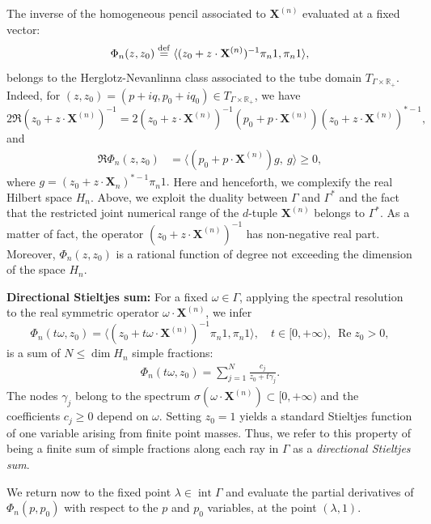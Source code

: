 \documentclass[11pt,reqno]{amsart}
\theoremstyle{plain}
\theoremstyle{definition}
\numberwithin{equation}{section}
\newcommand{\bydef}{\stackrel{\rm def}{=}}
\begin{document}
	
	The inverse of the homogeneous pencil associated to $\mathbf{X}^{(n)}$ evaluated at a fixed vector:
	\begin{equation}\label{Phi}
	\Phi_n(z, z_0) \bydef \langle (z_0 + z \cdot \mathbf{X}^{(n)})^{-1} \pi_n 1, \pi_n 1  \rangle,
	\end{equation}
	belongs to the Herglotz-Nevanlinna class associated to the tube domain $T_{\Gamma \times \mathbb{R}_+}$. Indeed, for $(z, z_0) = (p+ i q, p_0 + i q_0) \in T_{\Gamma \times \mathbb{R}_+}$, we have
	$$
	2 \Re ( z_0 + z \cdot {\mathbf X}^{(n)} )^{-1} 
	= 2 (z_0 + z \cdot {\mathbf X}^{(n)} )^{-1} ( p_0 + p\cdot {\mathbf X}^{(n)}) 
	(z_0 + z \cdot {\mathbf X}^{(n)} )^{*-1},
	$$
	and 
	\begin{align*}
		\Re \Phi_n(z, z_0) &=  \langle ( p_0 + p\cdot \mathbf{X}^{(n)} ) g , \ g  \rangle \geq 0,
	\end{align*}
	where $g = (z_0 + z \cdot {\mathbf X}_n )^{*-1} \pi_n1.$ Here and henceforth, we complexify the real Hilbert space $H_n$.
	Above, we exploit the duality between $\Gamma$ and $\Gamma^\ast$ and the fact that the restricted joint numerical range of the $d$-tuple $\mathbf{X}^{(n)}$ belongs to $\Gamma^\ast$.
	As a matter of fact, the operator  $(z_0 + z \cdot \mathbf{X}^{(n)})^{-1}$ has non-negative real part.
	Moreover, $\Phi_n(z, z_0)$ is a rational function of degree not exceeding the dimension of the space $H_n$. 

\vspace{2mm}

\noindent \textbf{Directional Stieltjes sum:}
For a fixed $\omega \in \Gamma$, applying the spectral resolution to the real symmetric operator $\omega \cdot \mathbf{X}^{(n)}$, we infer
$$
\Phi_n(t \omega, z_0) = \langle (z_0 + t\omega \cdot \mathbf{X}^{(n)})^{-1} \pi_n 1, \pi_n 1 \rangle, \quad t \in [0, +\infty), \ \operatorname{Re} z_0 > 0, 
$$
is a sum of $N \leq \dim H_n$ simple fractions:
\begin{align*}
    \Phi_n(t\omega, z_0) = \sum_{j=1}^N \frac{c_j}{z_0 + t \gamma_j}.
\end{align*}
The nodes $\gamma_j$ belong to the spectrum $\sigma(\omega \cdot \mathbf{X}^{(n)}) \subset [0, +\infty)$ and the coefficients $c_j \geq 0$ depend on $\omega$. Setting $z_0 = 1$ yields a standard Stieltjes function of one variable arising from finite point masses. Thus, we refer to this property of being a finite sum of simple fractions along each ray in $\Gamma$ as a \emph{directional Stieltjes sum}.
    

	We return now to the fixed point $\lambda \in \operatorname{int} \Gamma$ and evaluate the partial derivatives of $\Phi_n(p, p_0)$ with respect to the $p$ and $p_0$ variables, at the point $(\lambda, 1)$.
\end{document}
